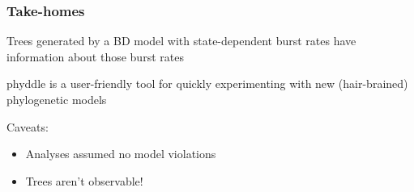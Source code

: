 \begin{frame}
    \frametitle{Take-homes}
    
    Trees generated by a BD model with state-dependent burst rates have
    information about those burst rates
    
    \bigskip
    phyddle is a user-friendly tool for quickly experimenting with new
    (hair-brained) phylogenetic models

    \bigskip
    Caveats:
    \begin{itemize}
        \item Analyses assumed no model violations
        \item Trees aren't observable!
    \end{itemize}
\end{frame}
